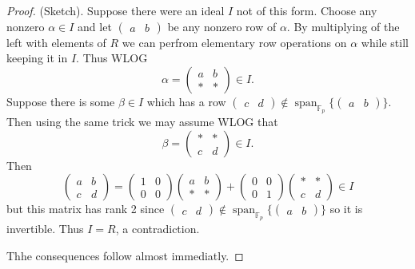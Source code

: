 \documentclass[10pt]{article}
\theoremstyle{plain}
\theoremstyle{definition}
\newcommand{\op}{\operatorname}
\newcommand{\F}{\mathbb{F}}
\begin{document}
\begin{proof}
    (Sketch).
    Suppose there were an ideal \( I \) not of this form.
    Choose any nonzero \( \alpha \in I \) and let \( \begin{pmatrix}a & b \end{pmatrix} \) be any nonzero row of \( \alpha \).
    By multiplying of the left with elements of \( R \) we can perfrom elementary row operations on \( \alpha \) while still keeping it in \( I \).
    Thus WLOG
    \[
        \alpha
        =
        \begin{pmatrix}
            a & b \\
            * & *
        \end{pmatrix} \in I.
    \]
    Suppose there is some \( \beta \in I \) which has a row \(\begin{pmatrix}c & d \end{pmatrix}  \not\in \op{span}_{\F_p}\{\begin{pmatrix}a & b \end{pmatrix} \} \).
    Then using the same trick we may assume WLOG that
    \[
        \beta
        =
        \begin{pmatrix}
            * & * \\
            c & d
        \end{pmatrix} \in I.
    \]
    Then
    \[
        \begin{pmatrix}
            a & b \\
            c & d
        \end{pmatrix}
        =
        \begin{pmatrix}
            1 & 0 \\
            0 & 0
        \end{pmatrix}
        \begin{pmatrix}
            a & b \\
            * & *
        \end{pmatrix}
        +
        \begin{pmatrix}
            0 & 0 \\
            0 & 1
        \end{pmatrix}
        \begin{pmatrix}
            * & * \\
            c & d
        \end{pmatrix}
        \in I
    \]
    but this matrix has rank 2 since \(\begin{pmatrix}c & d \end{pmatrix}  \not\in \op{span}_{\F_p}\{\begin{pmatrix}a & b \end{pmatrix} \} \) so it is invertible.
    Thus \( I = R \), a contradiction.

    Thhe consequences follow almost immediatly.
\end{proof}
\end{document}
